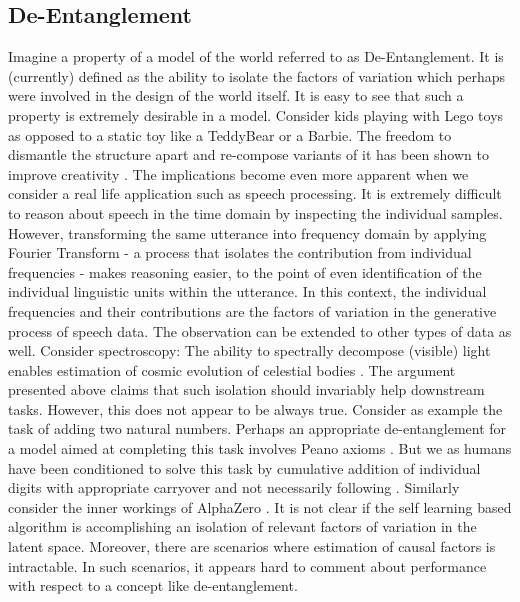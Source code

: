 \subsection{De-Entanglement}
Imagine a property of a model of the world referred to as De-Entanglement. It is (currently) defined as the ability to isolate the factors of variation which perhaps were involved in the design of the world itself. It is easy to see that such a property is extremely desirable in a model. Consider kids playing with Lego toys as opposed to a static toy like a TeddyBear or a Barbie. The freedom to dismantle the structure apart and re-compose variants of it has been shown to improve creativity \cite{gauntlett2014lego}. The implications become even more apparent when we consider a real life application such as speech processing. It is extremely difficult to reason about speech in the time domain by inspecting the individual samples. However, transforming the same utterance into frequency domain by applying Fourier Transform - a process that isolates the contribution from individual frequencies - makes reasoning easier, to the point of even identification of the individual linguistic units within the utterance. In this context, the individual frequencies and their contributions are the factors of variation in the generative process of speech data. The observation can be extended to other types of data as well. Consider spectroscopy: The ability to spectrally decompose (visible) light enables estimation of cosmic evolution of celestial bodies \cite{stellar_evolution}. The argument presented above claims that such isolation should invariably help downstream tasks. However, this does not appear to be always true. Consider as example the task of adding two natural numbers. Perhaps an appropriate de-entanglement for a model aimed at completing this task involves Peano axioms \cite{peano_axioms}. But we as humans have been conditioned to solve this task by cumulative addition of individual digits with appropriate carryover and not necessarily following \cite{peano_axioms}. Similarly consider  the inner workings of AlphaZero \cite{alpha_zero_withouthumans}. It is not clear if the self learning based algorithm is accomplishing an isolation of relevant factors of variation in the latent space. Moreover, there are scenarios where estimation of causal factors is intractable. In such scenarios, it appears hard to comment about performance with respect to a concept like de-entanglement. 

